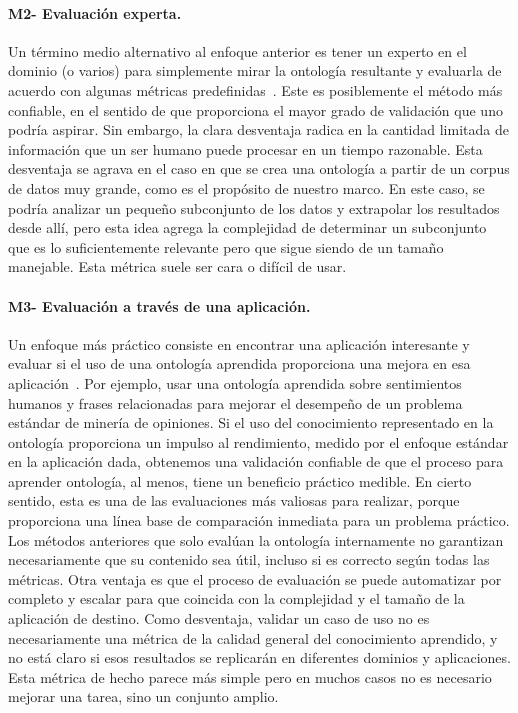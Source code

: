 \paragraph{M2- Evaluación experta.}

Un término medio alternativo al enfoque anterior es tener un experto en el dominio (o varios) para simplemente mirar la ontología resultante y evaluarla de acuerdo con algunas métricas predefinidas~\cite{ROSPOCHER2016132}.
Este es posiblemente el método más confiable, en el sentido de que proporciona el mayor grado de validación que uno podría aspirar.
Sin embargo, la clara desventaja radica en la cantidad limitada de información que un ser humano puede procesar en un tiempo razonable.
Esta desventaja se agrava en el caso en que se crea una ontología a partir de un corpus de datos muy grande, como es el propósito de nuestro marco.
En este caso, se podría analizar un pequeño subconjunto de los datos y extrapolar los resultados desde allí, pero esta idea agrega la complejidad de determinar un subconjunto que es lo suficientemente relevante pero que sigue siendo de un tamaño manejable.
Esta métrica suele ser cara o difícil de usar.

\paragraph{M3- Evaluación a través de una aplicación.}

Un enfoque más práctico consiste en encontrar una aplicación interesante y evaluar si el uso de una ontología aprendida proporciona una mejora en esa aplicación~\cite{gurevych2003semantic}.
Por ejemplo, usar una ontología aprendida sobre sentimientos humanos y frases relacionadas para mejorar el desempeño de un problema estándar de minería de opiniones.
Si el uso del conocimiento representado en la ontología proporciona un impulso al rendimiento, medido por el enfoque estándar en la aplicación dada, obtenemos una validación confiable de que el proceso para aprender ontología, al menos, tiene un beneficio práctico medible.
En cierto sentido, esta es una de las evaluaciones más valiosas para realizar, porque proporciona una línea base de comparación inmediata para un problema práctico.
Los métodos anteriores que solo evalúan la ontología internamente no garantizan necesariamente que su contenido sea útil, incluso si es correcto según todas las métricas.
Otra ventaja es que el proceso de evaluación se puede automatizar por completo y escalar para que coincida con la complejidad y el tamaño de la aplicación de destino.
Como desventaja, validar un caso de uso no es necesariamente una métrica de la calidad general del conocimiento aprendido, y no está claro si esos resultados se replicarán en diferentes dominios y aplicaciones.
Esta métrica de hecho parece más simple pero en muchos casos no es necesario mejorar una tarea, sino un conjunto amplio.


